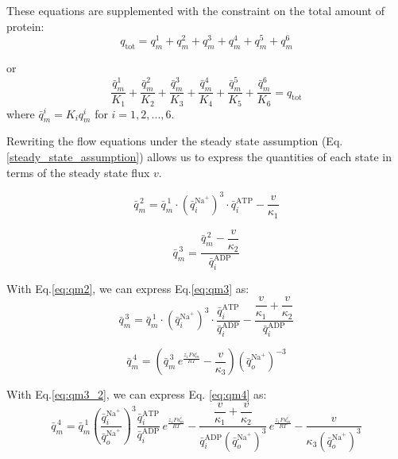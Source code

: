These equations are supplemented with the constraint on the total amount of protein:
\begin{equation}
      \label{total_protein_constraint}
      q_{\mathrm{tot}} = q_m^1 + q_m^2 + q_m^3 + q_m^4 + q_m^5 + q_m^6
\end{equation}

or 
\begin{equation}
\label{eq:total_q}
\frac{\bar{q}_m^{1}}{K_1} + 
\frac{\bar{q}_m^{2}}{K_2} + 
\frac{\bar{q}_m^{3}}{K_3} + 
\frac{\bar{q}_m^{4}}{K_4} + 
\frac{\bar{q}_m^{5}}{K_5} + 
\frac{\bar{q}_m^{6}}{K_6} 
= q_{\text{tot}}
\end{equation}
where $\bar{q}_m^{i} = K_i q_m^{i}$ for $i=1,2,...,6$.


Rewriting the flow equations under the steady state assumption (Eq. \ref{steady_state_assumption}) allows us to express the quantities of each state in terms of the steady state flux $v$.

\begin{equation}
\label{eq:qm2} 
  \bar{q}_m^{\,2}
=
\bar{q}_m^{\,1}
\cdot
\left(\bar{q}_i^{\mathrm{Na}^+}\right)^3
\cdot
\bar{q}_i^{\mathrm{ATP}}
-
\frac{v}{\kappa_1}
\end{equation}

\begin{equation}
\label{eq:qm3}
\bar{q}_m^{\,3}
=
\frac{\bar{q}_m^{\,2} - \dfrac{v}{\kappa_2}}{\bar{q}_i^{\mathrm{ADP}}}
\end{equation}

With Eq.\ref{eq:qm2}, we can express Eq.\ref{eq:qm3} as:
\begin{equation}
\label{eq:qm3_2}
\bar{q}_m^{\,3}
=
\bar{q}_m^{\,1}
\cdot
\left(\bar{q}_i^{\mathrm{Na}^+}\right)^3
\cdot
\frac{\bar{q}_i^{\mathrm{ATP}}}{\bar{q}_i^{\mathrm{ADP}}}
-
\frac{\dfrac{v}{\kappa_1} + \dfrac{v}{\kappa_2}}{\bar{q}_i^{\mathrm{ADP}}}
\end{equation}

\begin{equation}
      \label{eq:qm4}
 \bar{q}_m^{\,4}
=
\left(
\bar{q}_m^{\,3}
\, e^{\frac{z_1 F u_m^{e}}{R T}}
-
\frac{v}{\kappa_3}
\right)
\left(\bar{q}_o^{\mathrm{Na}^+}\right)^{-3}     
\end{equation}

With Eq.\ref{eq:qm3_2}, we can express Eq. \ref{eq:qm4} as:
\begin{equation}
      \label{eq:qm4_2}
 \bar{q}_m^{\,4}
=
\bar{q}_m^{\,1}
\left(
\frac{\bar{q}_i^{\mathrm{Na}^+}}{\bar{q}_o^{\mathrm{Na}^+}}
\right)^3
\frac{\bar{q}_i^{\mathrm{ATP}}}{\bar{q}_i^{\mathrm{ADP}}}
\, e^{\frac{z_1 F u_m^{e}}{R T}}
-
\frac{\dfrac{v}{\kappa_1}+\dfrac{v}{\kappa_2}}
{\bar{q}_i^{\mathrm{ADP}}\left(\bar{q}_o^{\mathrm{Na}^+}\right)^3}
\, e^{\frac{z_1 F u_m^{e}}{R T}}
-
\frac{v}{\kappa_3\left(\bar{q}_o^{\mathrm{Na}^+}\right)^3}
\end{equation}

